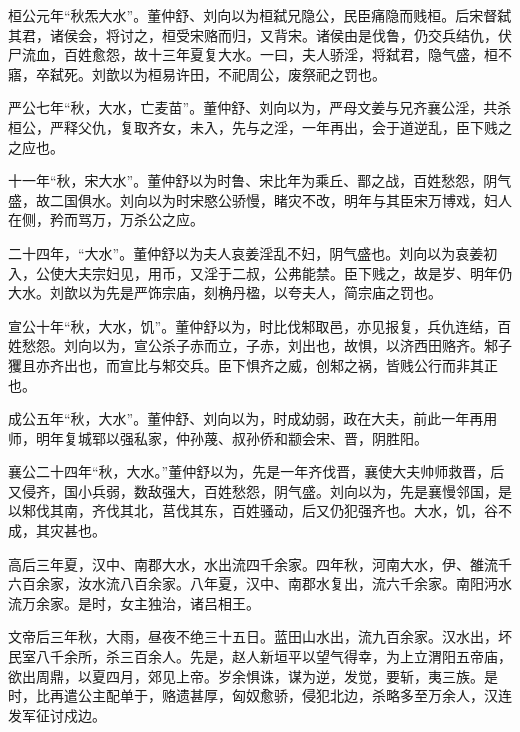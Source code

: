 \documentclass[12pt,UTF8]{ctexbook}
\begin{document}
桓公元年“秋炁大水”。董仲舒、刘向以为桓弑兄隐公，民臣痛隐而贱桓。后宋督弑其君，诸侯会，将讨之，桓受宋赂而归，又背宋。诸侯由是伐鲁，仍交兵结仇，伏尸流血，百姓愈怨，故十三年夏复大水。一曰，夫人骄淫，将弑君，隐气盛，桓不寤，卒弑死。刘歆以为桓易许田，不祀周公，废祭祀之罚也。



严公七年“秋，大水，亡麦苗”。董仲舒、刘向以为，严母文姜与兄齐襄公淫，共杀桓公，严释父仇，复取齐女，未入，先与之淫，一年再出，会于道逆乱，臣下贱之之应也。



十一年“秋，宋大水”。董仲舒以为时鲁、宋比年为乘丘、鄑之战，百姓愁怨，阴气盛，故二国俱水。刘向以为时宋愍公骄慢，睹灾不改，明年与其臣宋万博戏，妇人在侧，矜而骂万，万杀公之应。



二十四年，“大水”。董仲舒以为夫人哀姜淫乱不妇，阴气盛也。刘向以为哀姜初入，公使大夫宗妇见，用币，又淫于二叔，公弗能禁。臣下贱之，故是岁、明年仍大水。刘歆以为先是严饰宗庙，刻桷丹楹，以夸夫人，简宗庙之罚也。



宣公十年“秋，大水，饥”。董仲舒以为，时比伐邾取邑，亦见报复，兵仇连结，百姓愁怨。刘向以为，宣公杀子赤而立，子赤，刘出也，故惧，以济西田赂齐。邾子玃且亦齐出也，而宣比与邾交兵。臣下惧齐之威，创邾之祸，皆贱公行而非其正也。



成公五年“秋，大水”。董仲舒、刘向以为，时成幼弱，政在大夫，前此一年再用师，明年复城郓以强私家，仲孙蔑、叔孙侨和颛会宋、晋，阴胜阳。



襄公二十四年“秋，大水。”董仲舒以为，先是一年齐伐晋，襄使大夫帅师救晋，后又侵齐，国小兵弱，数敌强大，百姓愁怨，阴气盛。刘向以为，先是襄慢邻国，是以邾伐其南，齐伐其北，莒伐其东，百姓骚动，后又仍犯强齐也。大水，饥，谷不成，其灾甚也。



高后三年夏，汉中、南郡大水，水出流四千余家。四年秋，河南大水，伊、雒流千六百余家，汝水流八百余家。八年夏，汉中、南郡水复出，流六千余家。南阳沔水流万余家。是时，女主独治，诸吕相王。



文帝后三年秋，大雨，昼夜不绝三十五日。蓝田山水出，流九百余家。汉水出，坏民室八千余所，杀三百余人。先是，赵人新垣平以望气得幸，为上立渭阳五帝庙，欲出周鼎，以夏四月，郊见上帝。岁余惧诛，谋为逆，发觉，要斩，夷三族。是时，比再遣公主配单于，赂遗甚厚，匈奴愈骄，侵犯北边，杀略多至万余人，汉连发军征讨戍边。
\end{document}

